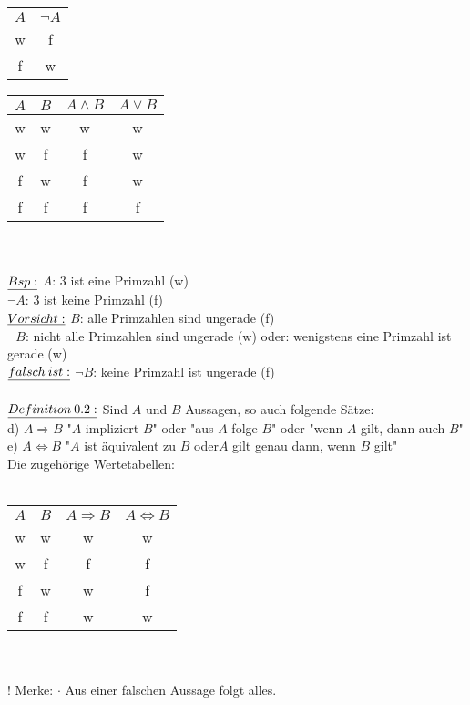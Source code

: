 \documentclass[fleqn, a4paper, 11pt]{article}
\begin{document}
\begin{tabular}{|c|c|}
	\hline
	$A$ & $\neg A$ \\
	\hline
	w & f \\
	f & w \\
	\hline
\end{tabular}
\hspace{2cm}
\begin{tabular}{|c|c|c|c|}
	\hline
	$A$ & $B$ & $A\wedge B$ & $A\vee B$ \\
	\hline
	w & w & w & w \\
	w & f & f & w \\
	f & w & f & w \\
	f & f & f & f \\
	\hline
\end{tabular}\\
\\
$\uline{Bsp:}$ $A$: 3 ist eine Primzahl (w)\\
	$\neg A$: 3 ist keine Primzahl (f)\\
$\uline{Vorsicht:}$ $B$: alle Primzahlen sind ungerade (f)\\
	$\neg B$: nicht alle Primzahlen sind ungerade (w) oder: wenigstens eine Primzahl ist gerade (w)\\
	\hspace{0,5cm}
	$\uline{falsch\:ist:}$ $\neg B$: keine Primzahl ist ungerade (f) \\
\\
$\uline{Definition\:0.2:}$ Sind $A$ und $B$ Aussagen, so auch folgende S\"atze:\\
d) $A\Rightarrow B$ "$A$ impliziert $B$" oder "aus $A$ folge $B$" oder "wenn $A$ gilt, dann auch $B$" \\
e) $A\Leftrightarrow B$ "$A$ ist \"aquivalent zu $B$ \dq oder\dq $A$ gilt genau dann, wenn $B$ gilt" \\
Die zugeh\"orige Wertetabellen:\\
\\
\begin{tabular}{|c|c|c|c|}
	\hline
	$A$ & $B$ & $A\Rightarrow B$ & $A\Leftrightarrow B$ \\
	\hline
	w & w & w & w \\
	w & f & f & f \\
	f & w & w & f \\
	f & f & w & w \\
	\hline
\end{tabular} \\
\\
! Merke: $\cdot$ Aus einer falschen Aussage folgt alles.\\
\end{document}
